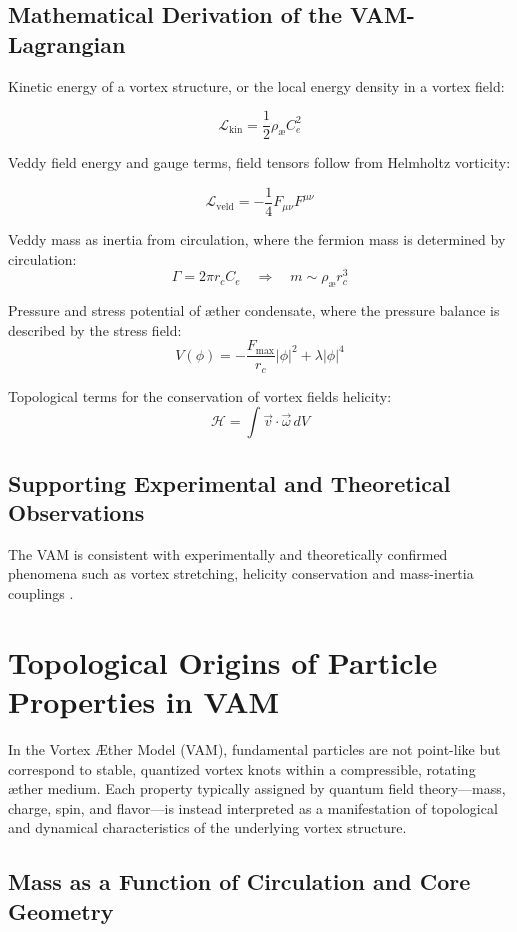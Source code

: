 
\subsection*{Mathematical Derivation of the VAM-Lagrangian}

Kinetic energy of a vortex structure, or the local energy density in a vortex field:

\[
\mathcal{L}_\text{kin} = \frac{1}{2}\rho_\text{\ae} C_e^2
\]

Veddy field energy and gauge terms, field tensors follow from Helmholtz vorticity:

\[
\mathcal{L}_\text{veld} = -\frac{1}{4}F_{\mu\nu}F^{\mu\nu}
\]

Veddy mass as inertia from circulation, where the fermion mass is determined by circulation:
\[
\Gamma = 2\pi r_c C_e \quad\Rightarrow\quad m \sim \rho_\text{\ae} r_c^3
\]

Pressure and stress potential of æther condensate, where the pressure balance is described by the stress field:
\[
V(\phi) = -\frac{F_\text{max}}{r_c}|\phi|^2 + \lambda|\phi|^4
\]

Topological terms for the conservation of vortex fields helicity:
\[
\mathcal{H} = \int \vec{v}\cdot\vec{\omega}\, dV
\]

\subsection*{Supporting Experimental and Theoretical Observations}
The VAM is consistent with experimentally and theoretically confirmed phenomena such as vortex stretching, helicity conservation and mass-inertia couplings \cite{batchelor1953,vinen2002,bewley2008,moffatt1969,kleckner2013,scheeler2014,bartlett1986}.


\section{Topological Origins of Particle Properties in VAM}

In the Vortex Æther Model (VAM), fundamental particles are not point-like but correspond to stable, quantized vortex knots within a compressible, rotating æther medium. Each property typically assigned by quantum field theory---mass, charge, spin, and flavor---is instead interpreted as a manifestation of topological and dynamical characteristics of the underlying vortex structure.

\subsection{Mass as a Function of Circulation and Core Geometry}

